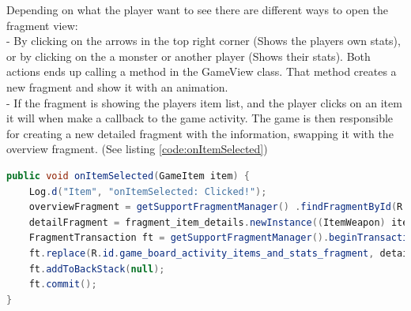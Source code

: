 Depending on what the player want to see there are different ways to open the fragment view:\\
 - By clicking on the arrows in the top right corner (Shows the players own stats), or by clicking on the a monster or another player (Shows their stats). Both actions ends up calling a method in the GameView class. That method creates a new fragment and show it with an animation. \\
- If the fragment is showing the players item list, and the player clicks on an item it will when make a callback to the game activity. The game is then responsible for creating a new detailed fragment with the information, swapping it with the overview fragment. (See listing \ref{code:onItemSelected})

\begin{lstlisting}[language=Java, caption=onItemSelected method is called when a player clicks on an item in the overview fragment, label=code:onItemSelected]
public void onItemSelected(GameItem item) {
    Log.d("Item", "onItemSelected: Clicked!");
    overviewFragment = getSupportFragmentManager() .findFragmentById(R.id.game_board_activity_items_and_stats_fragment);
    detailFragment = fragment_item_details.newInstance((ItemWeapon) item);
    FragmentTransaction ft = getSupportFragmentManager().beginTransaction();
    ft.replace(R.id.game_board_activity_items_and_stats_fragment, detailFragment);
    ft.addToBackStack(null);
    ft.commit();
}
\end{lstlisting}